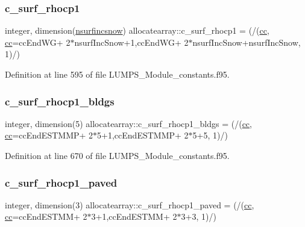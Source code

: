 \subsubsection{\texorpdfstring{c\+\_\+surf\+\_\+rhocp1}{c\_surf\_rhocp1}}
{\footnotesize\ttfamily integer, dimension(\hyperlink{namespaceallocatearray_af4d113f332b6759cfa22271140c9162d}{nsurfincsnow}) allocatearray\+::c\+\_\+surf\+\_\+rhocp1 = (/(\hyperlink{namespaceallocatearray_ac863c81704eb507dee10f5e10741e10c}{cc}, \hyperlink{namespaceallocatearray_ac863c81704eb507dee10f5e10741e10c}{cc}=cc\+End\+WG+ 2$\ast$nsurf\+Inc\+Snow+1,cc\+End\+WG+ 2$\ast$nsurf\+Inc\+Snow+nsurf\+Inc\+Snow, 1)/)}



Definition at line 595 of file L\+U\+M\+P\+S\+\_\+\+Module\+\_\+constants.\+f95.

\mbox{\label{namespaceallocatearray_a54737eb445f1177103369c151c2c7116}} 
\subsubsection{\texorpdfstring{c\+\_\+surf\+\_\+rhocp1\+\_\+bldgs}{c\_surf\_rhocp1\_bldgs}}
{\footnotesize\ttfamily integer, dimension(5) allocatearray\+::c\+\_\+surf\+\_\+rhocp1\+\_\+bldgs = (/(\hyperlink{namespaceallocatearray_ac863c81704eb507dee10f5e10741e10c}{cc}, \hyperlink{namespaceallocatearray_ac863c81704eb507dee10f5e10741e10c}{cc}=cc\+End\+E\+S\+T\+M\+MP+ 2$\ast$5+1,cc\+End\+E\+S\+T\+M\+MP+ 2$\ast$5+5, 1)/)}



Definition at line 670 of file L\+U\+M\+P\+S\+\_\+\+Module\+\_\+constants.\+f95.

\mbox{\label{namespaceallocatearray_aad671adcddf83ad0ed699852d5d0a824}} 
\subsubsection{\texorpdfstring{c\+\_\+surf\+\_\+rhocp1\+\_\+paved}{c\_surf\_rhocp1\_paved}}
{\footnotesize\ttfamily integer, dimension(3) allocatearray\+::c\+\_\+surf\+\_\+rhocp1\+\_\+paved = (/(\hyperlink{namespaceallocatearray_ac863c81704eb507dee10f5e10741e10c}{cc}, \hyperlink{namespaceallocatearray_ac863c81704eb507dee10f5e10741e10c}{cc}=cc\+End\+E\+S\+T\+MM+ 2$\ast$3+1,cc\+End\+E\+S\+T\+MM+ 2$\ast$3+3, 1)/)}




